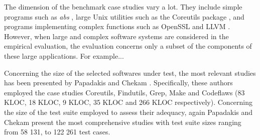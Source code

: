 
The dimension of the benchmark case studies vary a lot. They include simple programs such as \textit{abs} \cite{tokumoto2016muvm}, large Unix utilities such as the Coreutils package \cite{hariri2019comparing,papadakis2018mutation,chekam2017empirical}, and programs implementing complex functions such as OpenSSL and LLVM \cite{denisov2018mull}.
However, when large and complex software systems are considered in the empirical evaluation, the evaluation concerns only a subset of the components of these large applications.
For example... 

Concerning the size of the selected softwares under test, the most relevant studies has been presented by Papadakis and Chekam \cite{papadakis2018mutation,chekam2017empirical,papadakis2018mutant}. Specifically, these authors employed the case studies Coreutils, Findutils, Grep, Make and Codeflaws (83 KLOC, 18 KLOC, 9 KLOC, 35 KLOC and 266 KLOC respectively). 
Concerning the size of the test suite employed to assess their adequacy, again Papadakis and Chekam \cite{papadakis2018mutation,chekam2017empirical,papadakis2018mutant} present the most comprehensive studies with test suite sizes ranging from 58 131, to 122 261 test cases.






